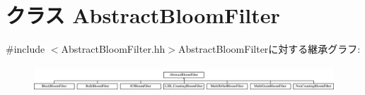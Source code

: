 \hypertarget{classAbstractBloomFilter}{
\section{クラス AbstractBloomFilter}
\label{classAbstractBloomFilter}
}


{\ttfamily \#include $<$AbstractBloomFilter.hh$>$}AbstractBloomFilterに対する継承グラフ:\begin{figure}[H]
\begin{center}
\leavevmode
\includegraphics[height=0.981595cm]{classAbstractBloomFilter}
\end{center}
\end{figure}

